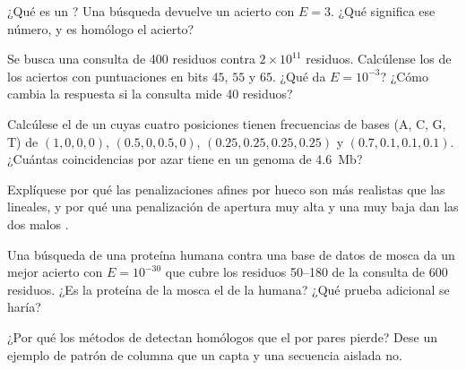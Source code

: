 \begin{exercise}[$\star$]\label{exo:b3:bioinformatics:4}
¿Qué es un ? Una búsqueda devuelve un acierto con $E = 3$. ¿Qué
significa ese número, y es homólogo el acierto?
\end{exercise}

\begin{exercise}[$\star\star$]\label{exo:b3:bioinformatics:5}
Se busca una consulta de \num{400} residuos contra $2\times 10^{11}$
residuos. Calcúlense los  de los aciertos con puntuaciones en
bits $45$, $55$ y $65$. ¿Qué  da $E = 10^{-3}$? ¿Cómo
cambia la respuesta si la consulta mide \num{40} residuos?
\end{exercise}

\begin{exercise}[$\star\star$]\label{exo:b3:bioinformatics:6}
Calcúlese el  de un  cuyas cuatro
posiciones tienen frecuencias de bases (A, C, G, T) de $(1,0,0,0)$,
$(0.5,0,0.5,0)$, $(0.25,0.25,0.25,0.25)$ y $(0.7,0.1,0.1,0.1)$. ¿Cuántas
coincidencias por azar tiene en un genoma de \qty{4.6}{Mb}?
\end{exercise}

\begin{exercise}[$\star\star$]\label{exo:b3:bioinformatics:7}
Explíquese por qué las penalizaciones afines por hueco son más realistas
que las lineales, y por qué una penalización de apertura muy alta y una
muy baja dan las dos malos .
\end{exercise}

\begin{exercise}[$\star\star$]\label{exo:b3:bioinformatics:8}
Una búsqueda  de una proteína humana contra una base de datos de
mosca da un mejor acierto con $E = 10^{-30}$ que cubre los residuos
50--180 de la consulta de \num{600} residuos. ¿Es la proteína de la mosca
el  de la humana? ¿Qué prueba adicional se haría?
\end{exercise}

\begin{exercise}[$\star\star$]\label{exo:b3:bioinformatics:9}
¿Por qué los métodos de  detectan homólogos que el  por
pares pierde? Dese un ejemplo de patrón de columna que un  capta y
una secuencia aislada no.
\end{exercise}

